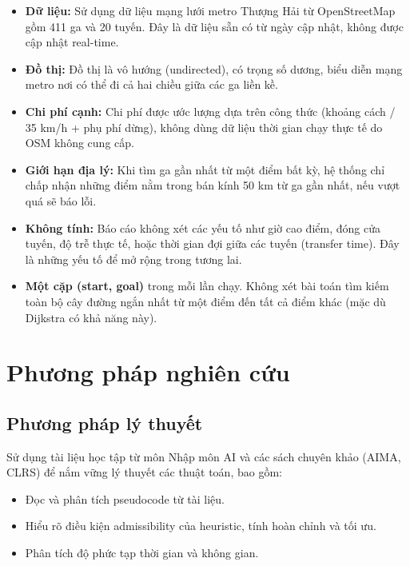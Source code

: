 \begin{itemize}
  \item \textbf{Dữ liệu:} Sử dụng dữ liệu mạng lưới metro Thượng Hải từ OpenStreetMap gồm 411 ga và 20 tuyến. Đây là dữ liệu sẵn có từ ngày cập nhật, không được cập nhật real-time.

  \item \textbf{Đồ thị:} Đồ thị là vô hướng (undirected), có trọng số dương, biểu diễn mạng metro nơi có thể đi cả hai chiều giữa các ga liền kề.

  \item \textbf{Chi phí cạnh:} Chi phí được ước lượng dựa trên công thức (khoảng cách / 35 km/h + phụ phí dừng), không dùng dữ liệu thời gian chạy thực tế do OSM không cung cấp.

  \item \textbf{Giới hạn địa lý:} Khi tìm ga gần nhất từ một điểm bất kỳ, hệ thống chỉ chấp nhận những điểm nằm trong bán kính 50 km từ ga gần nhất, nếu vượt quá sẽ báo lỗi.

  \item \textbf{Không tính:} Báo cáo không xét các yếu tố như giờ cao điểm, đóng cửa tuyến, độ trễ thực tế, hoặc thời gian đợi giữa các tuyến (transfer time). Đây là những yếu tố để mở rộng trong tương lai.

  \item \textbf{Một cặp (start, goal)} trong mỗi lần chạy. Không xét bài toán tìm kiếm toàn bộ cây đường ngắn nhất từ một điểm đến tất cả điểm khác (mặc dù Dijkstra có khả năng này).
\end{itemize}

\section{Phương pháp nghiên cứu}

\subsection{Phương pháp lý thuyết}

Sử dụng tài liệu học tập từ môn Nhập môn AI và các sách chuyên khảo (AIMA, CLRS) để nắm vững lý thuyết các thuật toán, bao gồm:
\begin{itemize}
  \item Đọc và phân tích pseudocode từ tài liệu.
  \item Hiểu rõ điều kiện admissibility của heuristic, tính hoàn chỉnh và tối ưu.
  \item Phân tích độ phức tạp thời gian và không gian.
\end{itemize}

